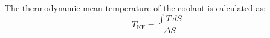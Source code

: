 The thermodynamic mean temperature of the coolant is calculated as:  
\[
T_{\text{KF}} = \frac{\int T \, dS}{\Delta S}
\]